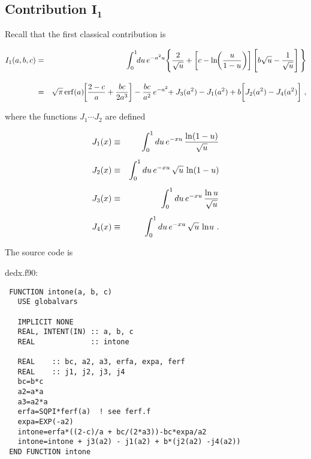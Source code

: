 \documentclass[preprint,12pt,eqsecnum,nofootinbib,amsmath,amssymb]{revtex4}
\begin{document}
\subsection{Contribution $\bm{I_1}$}


Recall that the first classical contribution is
\begin{mathletters}
\begin{eqnarray}
  I_1(a,b,c)
  &=&
  \int_0^1 \hskip-0.1cm du \, e^{-a^2 u} \Bigg\{ 
  \frac{2}{\sqrt{u}} + \left[ c - \ln\hskip-0.1cm 
  \left(\frac{u}{1-u} \right) \right] \Bigg[b \sqrt{u} 
  - \frac{1}{\sqrt{u}} \Bigg] \, \Bigg\} 
\\[10pt]\nonumber
  &=& 
   \sqrt{\pi}\, {\rm erf}(a)\hskip-0.1cm
  \left[\frac{2-c}{a} + \frac{bc}{2 a^3} \right] 
  - \frac{bc}{a^2}\,e^{-a^2} \hskip-0.1cm 
  + J_3(a^2) - J_1(a^2) + b\bigg[J_2(a^2) - J_4(a^2) 
  \bigg] \ ,
\\
\end{eqnarray}
\end{mathletters}
where the functions $J_1 \cdots J_2$ are defined

\pagebreak
\begin{mathletters}
\begin{eqnarray}
  J_1(x) &\equiv&
  \int_0^1 du\,e^{-x u} \, \frac{\ln(1-u)}
  {\sqrt{u}} 
\\[5pt]
  J_2(x) &\equiv&
  \int_0^1 du\,e^{-x u} \, \sqrt{u}\, 
  \ln(1-u)
\\[5pt]
  J_3(x) &\equiv& 
  \int_0^1 du\,e^{-x u} \, \frac{\ln u}
  {\sqrt{u}} 
\\[5pt]
  J_4(x) &\equiv &
  \int_0^1 du\,e^{-x u} \, \sqrt{u}\, 
  \ln \hskip-0.05cm u  \ .
\end{eqnarray}
\end{mathletters}

\noindent
The source code is
\hskip0.2cm 

{
\noindent
dedx.f90:
\baselineskip12pt
\begin{verbatim}
 FUNCTION intone(a, b, c) 
   USE globalvars

   IMPLICIT NONE
   REAL, INTENT(IN) :: a, b, c
   REAL             :: intone

   REAL    :: bc, a2, a3, erfa, expa, ferf
   REAL    :: j1, j2, j3, j4
   bc=b*c
   a2=a*a
   a3=a2*a
   erfa=SQPI*ferf(a)  ! see ferf.f
   expa=EXP(-a2)
   intone=erfa*((2-c)/a + bc/(2*a3))-bc*expa/a2
   intone=intone + j3(a2) - j1(a2) + b*(j2(a2) -j4(a2))
 END FUNCTION intone
\end{verbatim}
}
\end{document}
